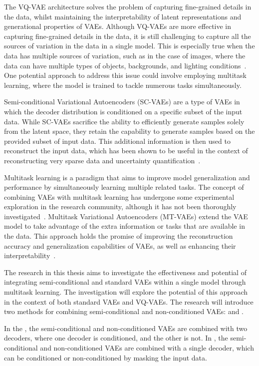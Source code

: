 The VQ-VAE architecture solves the problem of capturing fine-grained details in the data, whilst maintaining the interpretability of latent representations and generational properties of VAEs. 
Although VQ-VAEs are more effective in capturing fine-grained details in the data, it is still challenging to capture all the sources of variation in the data in a single model. This is especially true when the data has multiple sources of variation, such as in the case of images, where the data can have multiple types of objects, backgrounds, and lighting conditions~\cite{Kingma_2019,vqvae, vqvae2}. One potential approach to address this issue could involve employing multitask learning, where the model is trained to tackle numerous tasks simultaneously.

Semi-conditional Variational Autoencoders (SC-VAEs) are a type of VAEs in which the decoder distribution is conditioned on a specific subset of the input data. While SC-VAEs sacrifice the ability to efficiently generate samples solely from the latent space, they retain the capability to generate samples based on the provided subset of input data. This additional information is then used to reconstruct the input data, which has been shown to be useful in the context of reconstructing very sparse data and uncertainty quantification~\cite{Gundersen_2021}.

Multitask learning is a paradigm that aims to improve model generalization and performance by simultaneously learning multiple related tasks. The concept of combining VAEs with multitask learning has undergone some experimental exploration in the research community, although it has not been thoroughly investigated~\cite{multitaskvib}. Multitask Variational Autoencoders (MT-VAEs) extend the VAE model to take advantage of the extra information or tasks that are available in the data. This approach holds the promise of improving the reconstruction accuracy and generalization capabilities of VAEs, as well as enhancing their interpretability~\cite{multitasklearning}.

The research in this thesis aims to investigate the effectiveness and potential of integrating semi-conditional and standard VAEs within a single model through multitask learning. The investigation will explore the potential of this approach in the context of both standard VAEs and VQ-VAEs. The research will introduce two methods for combining semi-conditional and non-conditioned VAEs:  and .

In the , the semi-conditional and non-conditioned VAEs are combined with two decoders, where one decoder is conditioned, and the other is not. In , the semi-conditional and non-conditioned VAEs are combined with a single decoder, which can be conditioned or non-conditioned by masking the input data.

